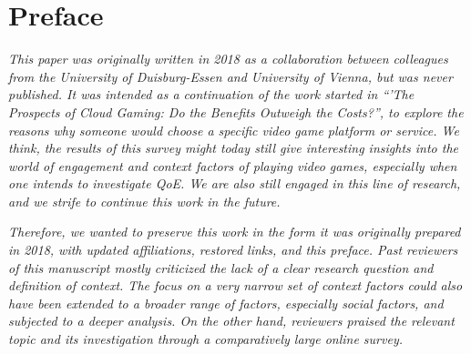\section*{Preface}


\textit{This paper was originally written in 2018 as a collaboration between colleagues from the University of Duisburg-Essen and University of Vienna, but was never published. It was intended as a continuation of the work started in ``'The Prospects of Cloud Gaming: Do the Benefits Outweigh the Costs?'', to explore the reasons why someone would choose a specific video game platform or service.
We think, the results of this survey might today still give interesting insights into the world of engagement and context factors of playing video games, especially when one intends to investigate QoE. We are also still engaged in this line of research, and we strife to continue this work in the future.} 

\textit{
Therefore, we wanted to preserve this work in the form it was originally prepared in 2018, with updated affiliations, restored links, and this preface. 
Past reviewers of this manuscript mostly criticized the lack of a clear research question and definition of context. The focus on a very narrow set of context factors could also have been extended to a broader range of factors, especially social factors, and subjected to a deeper analysis. On the other hand, reviewers praised the relevant topic and its investigation through a comparatively large online survey.
}

